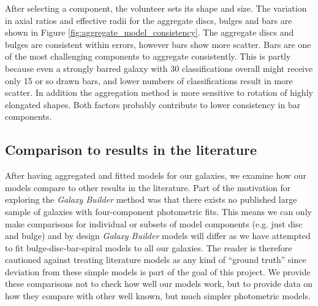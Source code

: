 \documentclass[../main.tex]{subfiles}
\begin{document}
\begin{figure*}
  \caption{Comparison of frequency of use of component in volunteer models between the original and validation sets of classifications. Errors shown on the disc, bulge and bar arise from Binomial error estimation. We see that classifications are generally consistent within errors, validating our assumption of volunteer independence.}
  \label{fig:volunteer_component_consistency}
\end{figure*}

After selecting a component, the volunteer sets its shape and size. The variation in axial ratios and effective radii for the aggregate discs, bulges and bars are shown in Figure \ref{fig:aggregate_model_consistency}. The aggregate discs and bulges are consistent within errors, however bars show more scatter. Bars are one of the most challenging components to aggregate consistently. This is partly because even a strongly barred galaxy with 30 classifications overall might receive only 15 or so drawn bars, and lower numbers of classifications result in more scatter. In addition the aggregation method is more sensitive to rotation of highly elongated shapes. Both factors probably contribute to lower consistency in bar components.

\begin{figure*}
  \caption{Comparison of component shape in aggregate models between the original and validation sets. Errors are obtained through the sample variance of clustered components, as detailed in Section \ref{sec:error_estimation}. We see close agreement between aggregate components from the two sets, suggesting that the clustering method is robust to the scatter in classifications.}
  \label{fig:aggregate_model_consistency}
\end{figure*}

\subsection{Comparison to results in the literature}

After having aggregated and fitted models for our galaxies, we examine how our models compare to other results in the literature. Part of the motivation for exploring the \textit{Galaxy Builder} method was that there exists no published large sample of galaxies with four-component photometric fits. This means we can only make comparisons for individual or subsets of model components (e.g. just disc and bulge) and by design \textit{Galaxy Builder} models will differ as we have attempted to fit bulge-disc-bar-spiral models to all our galaxies. The reader is therefore cautioned against treating literature models as any kind of ``ground truth'' since deviation from these simple models is part of the goal of this project. We provide these comparisons not to check how well our models work, but to provide data on how they compare with other well known, but much simpler photometric models.
\end{document}
